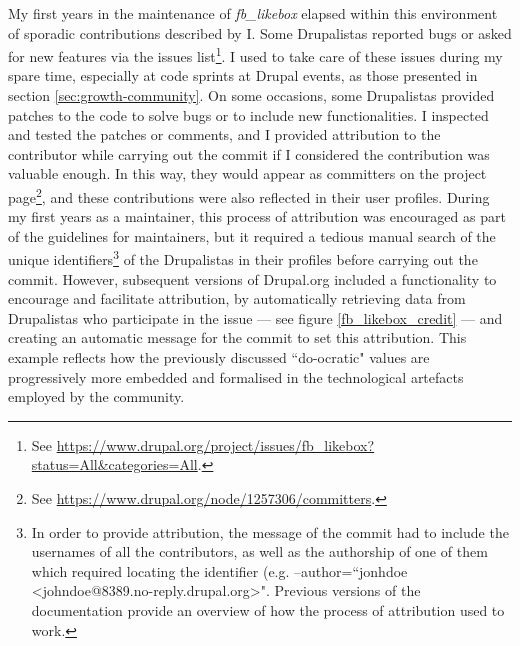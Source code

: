 My first years in the maintenance of \textit{fb\_likebox} elapsed within this environment of sporadic contributions described by I. Some Drupalistas reported bugs or asked for new features via the issues list\footnote{See \url{https://www.drupal.org/project/issues/fb_likebox?status=All&categories=All}.}. I used to take care of these issues during my spare time, especially at code sprints at Drupal events, as those presented in section \ref{sec:growth-community}. On some occasions, some Drupalistas provided patches to the code to solve bugs or to include new functionalities. I inspected and tested the patches or comments, and I provided attribution to the contributor while carrying out the commit if I considered the contribution was valuable enough. In this way, they would appear as committers on the project page\footnote{See \url{https://www.drupal.org/node/1257306/committers}.}, and these contributions were also reflected in their user profiles. During my first years as a maintainer, this process of attribution was encouraged as part of the guidelines for maintainers, but it required a tedious manual search of the unique identifiers\footnote{In order to provide attribution, the message of the commit had to include the usernames of all the contributors, as well as the authorship of one of them which required locating the identifier (e.g. --author=``jonhdoe \textless johndoe@8389.no-reply.drupal.org\textgreater". Previous versions of the documentation \parencite{credit-cvs:Online} provide an overview of how the process of attribution used to work.} of the Drupalistas in their profiles before carrying out the commit. However, subsequent versions of Drupal.org included a functionality to encourage and facilitate attribution, by automatically retrieving data from Drupalistas who participate in the issue --- see figure \ref{fb_likebox_credit} --- and creating an automatic message for the commit to set this attribution. This example reflects how the previously discussed ``do-ocratic" values are progressively more embedded and formalised in the technological artefacts employed by the community.


